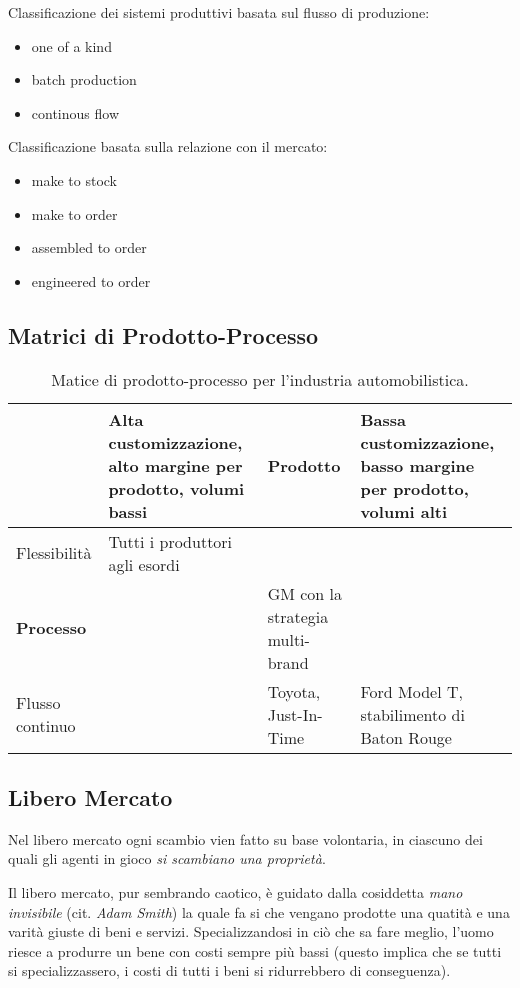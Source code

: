 \documentclass[a4paper,portrait,12pt]{article}
\theoremstyle{definition}
\begin{document}
Classificazione dei sistemi produttivi basata sul flusso di produzione:
\begin{itemize}
\item one of a kind
\item batch production
\item continous flow
\end{itemize}

Classificazione basata sulla relazione con il mercato:
\begin{itemize}
\item make to stock
\item make to order
\item assembled to order
\item engineered to order
\end{itemize}

\subsection{Matrici di Prodotto-Processo}

\begin{table}[H]
\begin{center}
\begin{tabular}{p{.13\linewidth}|p{.23\linewidth}|p{.23\linewidth}|p{.23\linewidth}}
& Alta customizzazione, alto margine per prodotto, volumi bassi & \textbf{Prodotto} & Bassa customizzazione, basso margine per prodotto, volumi alti\\
\hline
Flessibilità & Tutti i produttori agli esordi & &\\
\hline
\textbf{Processo} & & GM con la strategia multi-brand &\\
\hline
Flusso continuo & & Toyota, Just-In-Time & Ford Model T, stabilimento di Baton Rouge\\
\hline
\end{tabular}
\end{center}
\caption{Matice di prodotto-processo per l'industria automobilistica.}
\end{table}


\subsection{Libero Mercato}


Nel libero mercato ogni scambio vien fatto su base volontaria, in ciascuno dei quali gli agenti in gioco \emph{si scambiano una proprietà}.

Il libero mercato, pur sembrando caotico, è guidato dalla cosiddetta \emph{mano invisibile} (cit. \emph{Adam Smith}) la quale fa si che vengano prodotte una quatità e una varità giuste di beni e servizi.
Specializzandosi in ciò che sa fare meglio, l'uomo riesce a produrre un bene con costi sempre più bassi (questo implica che se tutti si specializzassero, i costi di tutti i beni si ridurrebbero di conseguenza).
\end{document}

